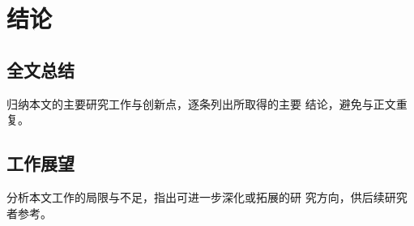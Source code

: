 \chapter{结论}
\label{chap:conclusion}

\section{全文总结}
归纳本文的主要研究工作与创新点，逐条列出所取得的主要
结论，避免与正文重复。

\section{工作展望}
分析本文工作的局限与不足，指出可进一步深化或拓展的研
究方向，供后续研究者参考。
